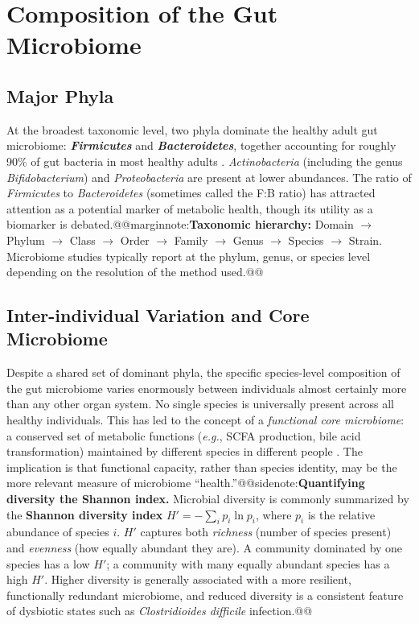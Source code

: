 \documentclass{tufte-handout}
\makeatletter
\def\marginnote#1{@@marginnote:#1@@}
\def\sidenote#1{@@sidenote:#1@@}
\makeatother
\begin{document}
\section{Composition of the Gut Microbiome}

\subsection{Major Phyla}

At the broadest taxonomic level, two phyla dominate the healthy adult gut microbiome: \textbf{\textit{Firmicutes}} and \textbf{\textit{Bacteroidetes}}, together accounting for roughly 90\% of gut bacteria in most healthy adults \citep{eckburgDiversityHumanIntestinal2005}. \textit{Actinobacteria} (including the genus \textit{Bifidobacterium}) and \textit{Proteobacteria} are present at lower abundances. The ratio of \textit{Firmicutes} to \textit{Bacteroidetes} (sometimes called the F:B ratio) has attracted attention as a potential marker of metabolic health, though its utility as a biomarker is debated.\marginnote{\textbf{Taxonomic hierarchy:} Domain $\to$ Phylum $\to$ Class $\to$ Order $\to$ Family $\to$ Genus $\to$ Species $\to$ Strain. Microbiome studies typically report at the phylum, genus, or species level depending on the resolution of the method used.}

\subsection{Inter-individual Variation and Core Microbiome}

Despite a shared set of dominant phyla, the specific species-level composition of the gut microbiome varies enormously between individuals almost certainly more than any other organ system. No single species is universally present across all healthy individuals. This has led to the concept of a \emph{functional core microbiome}: a conserved set of metabolic functions (\textit{e.g.}, SCFA production, bile acid transformation) maintained by different species in different people \citep{humanmicrobiomeprojectconsortiumStructureFunctionHuman2012}. The implication is that functional capacity, rather than species identity, may be the more relevant measure of microbiome ``health.''\sidenote{\textbf{Quantifying diversity the Shannon index.}\index{Microbiome!Shannon diversity index} Microbial diversity is commonly summarized by the \textbf{Shannon diversity index} $H' = -\sum_{i} p_i \ln p_i$, where $p_i$ is the relative abundance of species $i$. $H'$ captures both \textit{richness} (number of species present) and \textit{evenness} (how equally abundant they are). A community dominated by one species has a low $H'$; a community with many equally abundant species has a high $H'$. Higher diversity is generally associated with a more resilient, functionally redundant microbiome, and reduced diversity is a consistent feature of dysbiotic states such as \textit{Clostridioides difficile} infection.}
\end{document}
